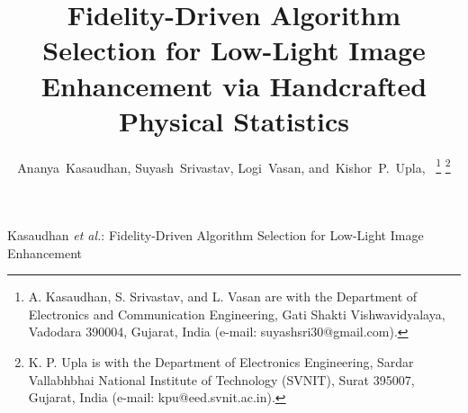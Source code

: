 \documentclass[journal]{IEEEtran}
\begin{document}
\title{Fidelity-Driven Algorithm Selection for Low-Light Image Enhancement via Handcrafted Physical Statistics}

\author{Ananya~Kasaudhan,
        Suyash~Srivastav,
        Logi~Vasan,
        and~Kishor~P.~Upla,~%
\thanks{A. Kasaudhan, S. Srivastav, and L. Vasan are with the Department of Electronics and Communication Engineering, Gati Shakti Vishwavidyalaya, Vadodara 390004, Gujarat, India (e-mail: suyashsri30@gmail.com).}%
\thanks{K. P. Upla is with the Department of Electronics Engineering, Sardar Vallabhbhai National Institute of Technology (SVNIT), Surat 395007, Gujarat, India (e-mail: kpu@eed.svnit.ac.in).}%
}

%
{Kasaudhan \MakeLowercase{\textit{et al.}}: Fidelity-Driven Algorithm Selection for Low-Light Image Enhancement}

\maketitle
\end{document}
